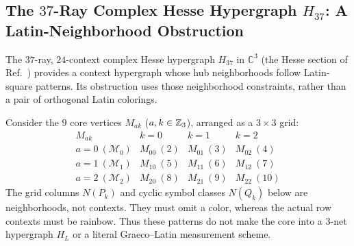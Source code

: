 \documentclass[aps,pra,reprint,superscriptaddress,longbibliography,nofootinbib,floatfix,10pt]{revtex4-2}
\theoremstyle{definition}\newtheorem{definition}[theorem]{Definition}
\theoremstyle{remark}\newtheorem{remark}[theorem]{Remark}
\newcommand{\C}{\mathbb C}\newcommand{\R}{\mathbb R}\newcommand{\Q}{\mathbb Q}
\begin{document}
\subsection{The \texorpdfstring{$37$}{37}-Ray Complex Hesse Hypergraph \texorpdfstring{$H_{37}$}{H37}: A Latin-Neighborhood Obstruction}\label{sec:H37}

The $37$-ray, $24$-context complex Hesse hypergraph $H_{37}$ in $\C^3$ (the Hesse section of Ref.~\cite{svozil2026contexts}) provides a context hypergraph whose hub neighborhoods follow Latin-square patterns. Its obstruction uses those neighborhood constraints, rather than a pair of orthogonal Latin colorings.

Consider the $9$ core vertices $M_{ak}$ ($a,k\in\mathbb Z_3$), arranged as a $3\times 3$ grid:
\begin{equation}\label{eq:H37-grid}
\begin{array}{c|ccc}
M_{ak} & k=0 & k=1 & k=2\\\hline
a=0\ (\mathcal{M}_0) & M_{00}\ (2) & M_{01}\ (3) & M_{02}\ (4)\\
a=1\ (\mathcal{M}_1) & M_{10}\ (5) & M_{11}\ (6) & M_{12}\ (7)\\
a=2\ (\mathcal{M}_2) & M_{20}\ (8) & M_{21}\ (9) & M_{22}\ (10)
\end{array}
\end{equation}
The grid columns $N(P_k)$ and cyclic symbol classes $N(Q_k)$ below are neighborhoods, not contexts. They must omit a color, whereas the actual row contexts must be rainbow. Thus these patterns do not make the core into a $3$-net hypergraph $H_L$ or a literal Graeco--Latin measurement scheme.
\end{document}
